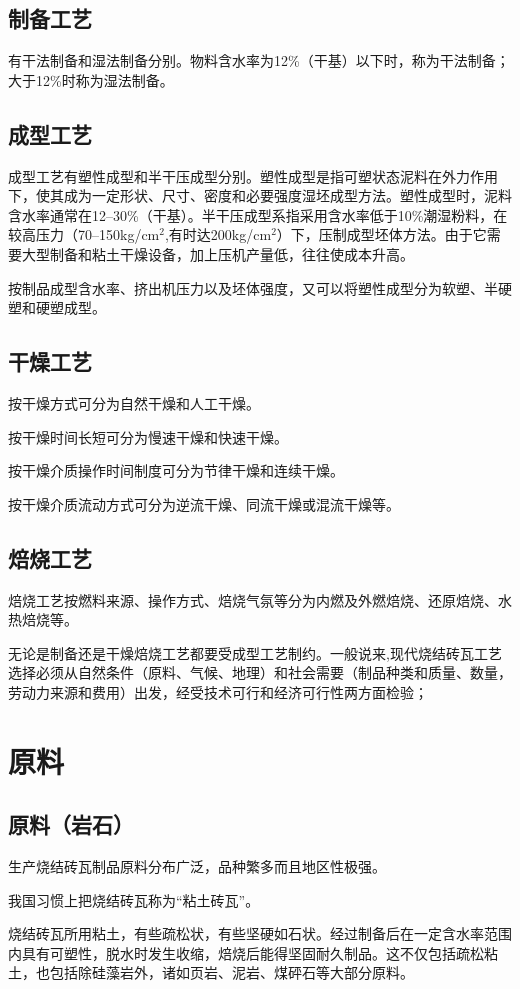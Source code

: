 \documentclass{ctexbook}
\begin{document}
\subsection{制备工艺}
有干法制备和湿法制备分别。物料含水率为12\%（干基）以下时，称为干法制备；大于12\%时称为湿法制备。
\subsection{成型工艺}
成型工艺有塑性成型和半干压成型分别。塑性成型是指可塑状态泥料在外力作用下，使其成为一定形状、尺寸、密度和必要强度湿坯成型方法。塑性成型时，泥料含水率通常在12--30\%（干基）。半干压成型系指采用含水率低于10\%潮湿粉料，在较高压力（70--150kg/cm$^{2}$,有时达200kg/cm$^{2}$）下，压制成型坯体方法。由于它需要大型制备和粘土干燥设备，加上压机产量低，往往使成本升高。

按制品成型含水率、挤出机压力以及坯体强度，又可以将塑性成型分为软塑、半硬塑和硬塑成型。
\subsection{干燥工艺}
按干燥方式可分为自然干燥和人工干燥。

按干燥时间长短可分为慢速干燥和快速干燥。

按干燥介质操作时间制度可分为节律干燥和连续干燥。

按干燥介质流动方式可分为逆流干燥、同流干燥或混流干燥等。
\subsection{焙烧工艺}
焙烧工艺按燃料来源、操作方式、焙烧气氛等分为内燃及外燃焙烧、还原焙烧、水热焙烧等。

无论是制备还是干燥焙烧工艺都要受成型工艺制约。一般说来,现代烧结砖瓦工艺选择必须从自然条件（原料、气候、地理）和社会需要（制品种类和质量、数量，劳动力来源和费用）出发，经受技术可行和经济可行性两方面检验；
\section{原料}
\subsection{原料（岩石）}
生产烧结砖瓦制品原料分布广泛，品种繁多而且地区性极强。

我国习惯上把烧结砖瓦称为“粘土砖瓦”。

烧结砖瓦所用粘土，有些疏松状，有些坚硬如石状。经过制备后在一定含水率范围内具有可塑性，脱水时发生收缩，焙烧后能得坚固耐久制品。这不仅包括疏松粘土，也包括除硅藻岩外，诸如页岩、泥岩、煤砰石等大部分原料。
\end{document}

